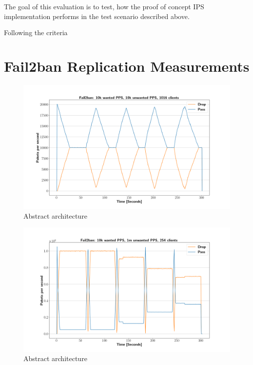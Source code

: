 The goal of this evaluation is to test, how the proof of concept \ac{IPS} implementation performs in the test scenario described above. 

Following the criteria 

\section{Fail2ban Replication Measurements}


\begin{figure}[p]
	\label{fig:fail2ban:10k}
    \centerline{\includegraphics[width=1.2\textwidth]{images/fail2ban_v10k_iv10k_c1016.png}}
    \caption[Fail2Ban Replication Measurements 1]{Abstract architecture }
\end{figure}

\begin{figure}[p]
	\label{fig:fail2ban:1m}
    \centerline{\includegraphics[width=1.2\textwidth]{images/fail2ban_v50k_iv1m_c254.png}}
    \caption[IPC Architecture]{Abstract architecture }
\end{figure}

